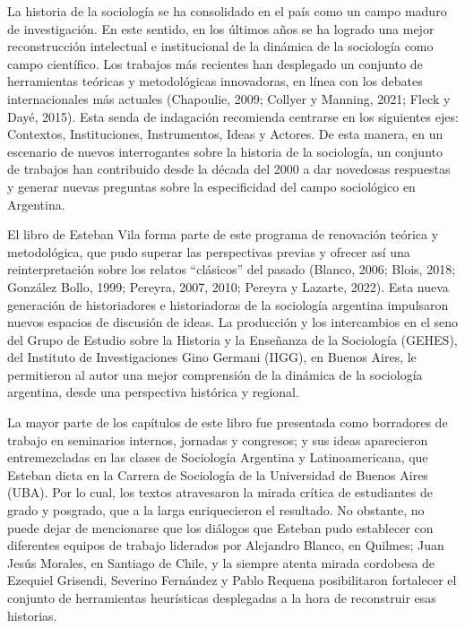 La historia de la sociología se ha consolidado en el país como un campo maduro de investigación. En este sentido, en los últimos años se ha logrado una mejor reconstrucción intelectual e institucional de la dinámica de la sociología como campo científico. Los trabajos más recientes han desplegado un conjunto de herramientas teóricas y metodológicas innovadoras, en línea con los debates internacionales más actuales (Chapoulie, 2009; Collyer y Manning, 2021; Fleck y Dayé, 2015). Esta senda de indagación recomienda centrarse en los siguientes ejes: Contextos, Instituciones, Instrumentos, Ideas y Actores. De esta manera, en un escenario de nuevos interrogantes sobre la historia de la sociología, un conjunto de trabajos han contribuido desde la década del 2000 a dar novedosas respuestas y generar nuevas preguntas sobre la especificidad del campo sociológico en Argentina.

El libro de Esteban Vila forma parte de este programa de renovación teórica y metodológica, que pudo superar las perspectivas previas y ofrecer así una reinterpretación sobre los relatos \enquote{clásicos} del pasado \parencite{1547-NOE2005}(Blanco, 2006; Blois, 2018; González Bollo, 1999; Pereyra, 2007, 2010; Pereyra y Lazarte, 2022). Esta nueva generación de historiadores e historiadoras de la sociología argentina impulsaron nuevos espacios de discusión de ideas. La producción y los intercambios en el seno del Grupo de Estudio sobre la Historia y la Enseñanza de la Sociología (GEHES), del Instituto de Investigaciones Gino Germani (IIGG), en Buenos Aires, le permitieron al autor una mejor comprensión de la dinámica de la sociología argentina, desde una perspectiva histórica y regional.

La mayor parte de los capítulos de este libro fue presentada como borradores de trabajo en seminarios internos, jornadas y congresos; y sus ideas aparecieron entremezcladas en las clases de Sociología Argentina y Latinoamericana, que Esteban dicta en la Carrera de Sociología de la Universidad de Buenos Aires (UBA). Por lo cual, los textos atravesaron la mirada crítica de estudiantes de grado y posgrado, que a la larga enriquecieron el resultado. No obstante, no puede dejar de mencionarse que los diálogos que Esteban pudo establecer con diferentes equipos de trabajo liderados por Alejandro Blanco, en Quilmes; Juan Jesús Morales, en Santiago de Chile, y la siempre atenta mirada cordobesa de Ezequiel Grisendi, Severino Fernández y Pablo Requena posibilitaron fortalecer el conjunto de herramientas heurísticas desplegadas a la hora de reconstruir esas historias.

